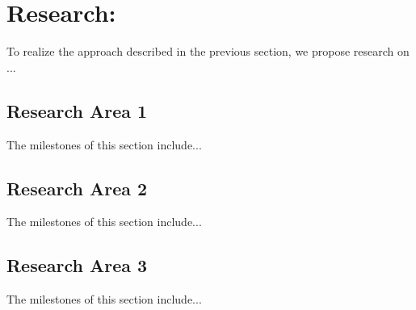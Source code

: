 \section{Research: }
\label{sec:research}

To realize the approach described in the previous section, we propose
research on ...

\subsection{Research Area 1}
\label{sec:research:1}
The milestones of this section include...

\subsection{Research Area 2}
\label{sec:research:2}

The milestones of this section include...
\subsection{Research Area 3}
\label{sec:research:3}

The milestones of this section include...
